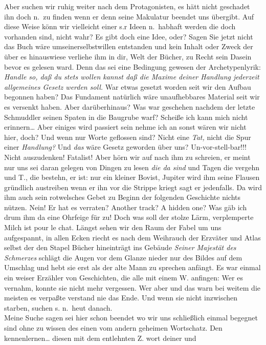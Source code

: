\documentclass[
]{article}
\begin{document}
Aber suchen wir ruhig weiter nach dem Protagonisten, es hätt nicht
geschadet ihn doch n.~zu finden wenn er denn seine Makulatur beendet uns
übergibt. Auf diese Weise könn wir vielleicht einer s.r Ideen n.~habhaft
werden die doch vorhanden sind, nicht wahr? Es gibt doch eine Idee,
oder? Sagen Sie jetzt nicht das Buch wäre umseinerselbstwillen
entstanden und kein Inhalt oder Zweck der über es hinauswiese verliehe
ihm in dir, Welt der Bücher, zu Recht sein Dasein bevor es gelesen ward.
Denn das sei eine Bedingung gewesen der Archetypenlyrik: \emph{Handle
so, daß du stets wollen kannst daß die Maxime deiner Handlung jederzeit
allgemeines Gesetz werden soll.} War etwas gesetzt worden seit wir den
Aufbau begonnen haben? Das Fundament natürlich wäre unaufhebbares
Material seit wir es versenkt haben. Aber darüberhinaus? Was war
geschehen nachdem der letzte Schmuddler seinen Spaten in die Baugrube
warf? Scheiße ich kann mich nicht erinnern\ldots{} Aber einiges wird
passiert sein nehme ich an sonst wären wir nicht hier, doch? Und wenn
nur Worte geflossen sind? Nicht eine \emph{Tat,} nicht die Spur einer
\emph{Handlung?} Und \emph{das} wäre Gesetz geworden über uns?
Un-vor-stell-bar!!! Nicht auszudenken! Fatalist! Aber hörn wir auf nach
ihm zu schreien, er meint nur uns sei daran gelegen von Dingen zu lesen
\emph{die da sind} und Tagen die vergehn und T., die bestehn, er ist:
nur ein kleiner Bovist, Jupiter wird ihm seine Flausen gründlich
austreiben wenn er ihn vor die Strippe kriegt sagt er jedenfalls. Da
wird ihm auch sein rotwelsches Gebet zu Beginn der folgenden Geschichte
nichts nützen. Nein! Er hat es verraten? Another track? A hidden one?
Was gäb ich drum ihm da eine Ohrfeige für zu! Doch was soll der stolze
Lärm, verplemperte Milch ist pour le chat. Längst sehen wir den Raum der
Fabel um uns aufgespannt, in allen Ecken riecht es nach dem Weihrauch
der Erzväter und Atlas selbst der den Stapel Bücher hineinträgt ins
Gebäude \emph{Seiner Majestät des Schmerzes} schlägt die Augen vor dem
Glanze nieder nur des Bildes auf dem Umschlag und hebt sie erst als der
alte Mann zu sprechen anfängt. Es war einmal ein weiser Erzähler von
Geschichten, die alle mit einem W. anfingen: Wer es vernahm, konnte sie
nicht mehr vergessen. Wer aber und das warn bei weitem die meisten es
verpaßte verstand nie das Ende. Und wenn sie nicht inzwischen starben,
suchen s. n.~heut danach.\\
Meine Suche sagen sei hier schon beendet wo wir uns schließlich einmal
begegnet sind ohne zu wissen des einen vom andern geheimen Wortschatz.
Den kennenlernen\ldots{} diesen mit dem entlehnten Z. wort deiner und
\end{document}

